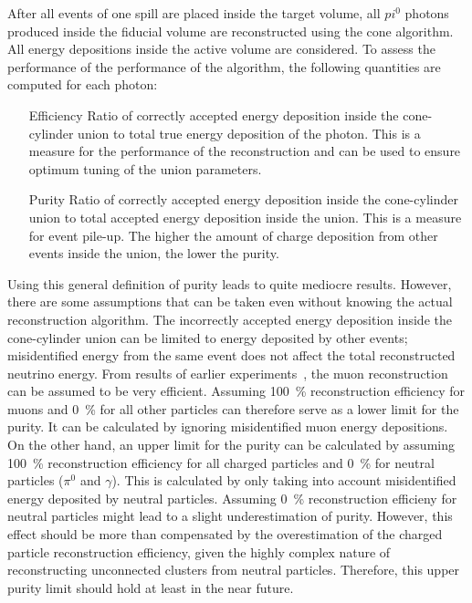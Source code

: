 After all events of one spill are placed inside the target volume, all $pi^0$ photons produced inside the fiducial volume are reconstructed using the cone algorithm.
All energy depositions inside the active volume are considered.
To assess the performance of the performance of the algorithm, the following quantities are computed for each photon:
\begin{itemize}
	\item[Efficiency] Ratio of correctly accepted energy deposition inside the cone-cylinder union to total true energy deposition of the photon.
		This is a measure for the performance of the reconstruction and can be used to ensure optimum tuning of the union parameters.
	\item[Purity] Ratio of correctly accepted energy deposition inside the cone-cylinder union to total accepted energy deposition inside the union.
		This is a measure for event pile-up.
		The higher the amount of charge deposition from other events inside the union, the lower the purity.
\end{itemize}
Using this general definition of purity leads to quite mediocre results.
However, there are some assumptions that can be taken even without knowing the actual reconstruction algorithm.
The incorrectly accepted energy deposition inside the cone-cylinder union can be limited to energy deposited by other events; misidentified energy from the same event does not affect the total reconstructed neutrino energy.
From results of earlier experiments~\cite{sauce}, the muon reconstruction can be assumed to be very efficient.
Assuming \SI{100}{\percent} reconstruction efficiency for muons and \SI{0}{\percent} for all other particles can therefore serve as a lower limit for the purity.
It can be calculated by ignoring misidentified muon energy depositions.
On the other hand, an upper limit for the purity can be calculated by assuming \SI{100}{\percent} reconstruction efficiency for all charged particles and \SI{0}{\percent} for neutral particles ($\pi^0$ and $\gamma$).
This is calculated by only taking into account misidentified energy deposited by neutral particles.
Assuming \SI{0}{\percent} reconstruction efficieny for neutral particles might lead to a slight underestimation of purity.
However, this effect should be more than compensated by the overestimation of the charged particle reconstruction efficiency, given the highly complex nature of reconstructing unconnected clusters from neutral particles.
Therefore, this upper purity limit should hold at least in the near future.